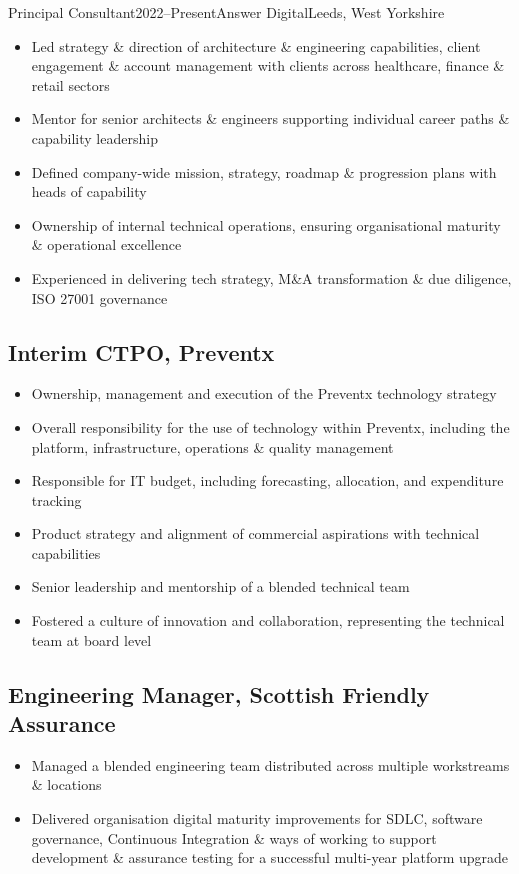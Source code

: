 \documentclass{cv}
\begin{document}
\begin{experienceplain}{Principal Consultant}{2022--Present}{Answer Digital}{Leeds, West Yorkshire}
\begin{itemize}
\item Led strategy \& direction of architecture \& engineering capabilities, client engagement
      \& account management with clients across healthcare, finance \& retail sectors
\item Mentor for senior architects \& engineers supporting individual career paths \& capability leadership
\item Defined company-wide mission, strategy, roadmap \& progression plans with heads of capability
\item Ownership of internal technical operations, ensuring organisational maturity \& operational excellence
\item Experienced in delivering tech strategy, M\&A transformation \& due diligence, ISO 27001 governance
\end{itemize}

\subsection{Interim CTPO, Preventx}
\begin{itemize}
\item Ownership, management and execution of the Preventx technology strategy
\item Overall responsibility for the use of technology within Preventx, including the platform,
      infrastructure, operations \& quality management
\item Responsible for IT budget, including forecasting, allocation, and expenditure tracking
\item Product strategy and alignment of commercial aspirations with technical capabilities
\item Senior leadership and mentorship of a blended technical team
\item Fostered a culture of innovation and collaboration, representing the technical team at board level
\end{itemize}

\subsection{Engineering Manager, Scottish Friendly Assurance}
\begin{itemize}
\item Managed a blended engineering team distributed across multiple workstreams \& locations
\item Delivered organisation digital maturity improvements for SDLC, software governance,
      Continuous Integration \& ways of working to support development \& assurance testing for a
      successful multi-year platform upgrade
\end{itemize}


\end{experienceplain}
\end{document}

